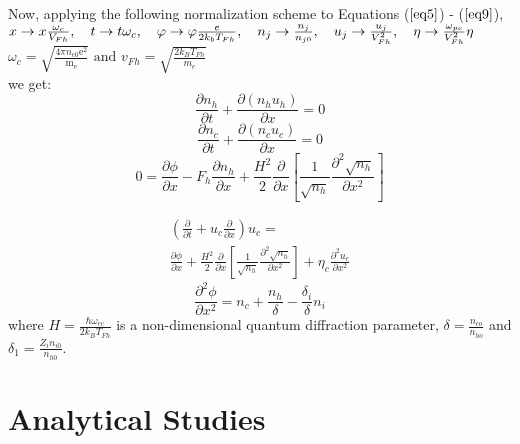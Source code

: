 \documentclass[journal]{IEEEtran}
\begin{document}
Now, applying the following normalization scheme to Equations ($\ref{eq5}$) - ($\ref{eq9}$), \\
$x \rightarrow x \frac{\omega_{c}}{V_{F h}}, \quad t \rightarrow t \omega_{c}, \quad \varphi \rightarrow \varphi \frac{e}{2 k_{b} T_{F h}}, \\
\quad n_{j} \rightarrow \frac{n_{j}}{n_{j 0}}, \quad u_{j} \rightarrow \frac{u_{j}}{V_{F h}^{2}}, \quad \eta \rightarrow \frac{\omega_{p e}}{V_{F h}^{2}} \eta$\\
$\omega_{c}=\sqrt{\frac{4 \pi n_{\mathrm{c} 0} \mathrm{e}^{2}}{\mathrm{m}_{\mathrm{e}}}} \text { and } v_{F h}=\sqrt{\frac{2 k_{B} T_{F h}}{m_{e}}}$\\
we get:
\begin{equation}\label{eq10}
\frac{\partial n_{h}}{\partial t}+\frac{\partial\left(n_{h} u_{h}\right)}{\partial x}=0
\end{equation}
\begin{equation}\label{eq11}
\frac{\partial n_{c}}{\partial t}+\frac{\partial\left(n_{c} u_{c}\right)}{\partial x}=0
\end{equation}
\begin{equation}\label{eq12}
0=\frac{\partial \phi}{\partial x}-F_{h} \frac{\partial n_{h}}{\partial x}+\frac{H^{2}}{2} \frac{\partial}{\partial x}\left[\frac{1}{\sqrt{n_{h}}} \frac{\partial^{2} \sqrt{n_{h}}}{\partial x^{2}}\right]
\end{equation}

\begin{multline}\label{eq13}
\left(\frac{\partial}{\partial t}+u_{c} \frac{\partial}{\partial x}\right) u_{c}=\\ \frac{\partial \phi}{\partial x}+\frac{H^{2}}{2} \frac{\partial}{\partial x}\left[\frac{1}{\sqrt{n_{h}}} \frac{\partial^{2} \sqrt{n_{h}}}{\partial x^{2}}\right]+\eta_{c} \frac{\partial^{2} u_{c}}{\partial x^{2}}
\end{multline}
\begin{equation}\label{eq14}
\frac{\partial^{2}\phi}{\partial x^{2}}=n_{c}+\frac{n_{h}}{\delta}-\frac{\delta_{i}}{\delta} n_{i}
\end{equation}
where $H= \frac{\hbar\omega_{ec}}{2k_B T_{Fh} }$ is a non-dimensional quantum diffraction parameter, $\delta=\frac{n_{co}}{n_{ho}}$  and $\delta_1=\frac{Z_i n_{i0}}{n_{h0}}$. 

\section{Analytical Studies}\label{III}
\end{document}
